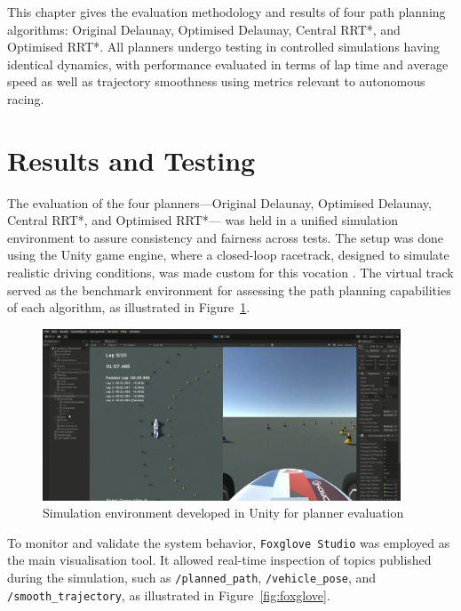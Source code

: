 \documentclass[a4paper,11pt]{report}
\begin{document}
This chapter gives the evaluation methodology and results of four path planning algorithms: Original Delaunay, 
Optimised Delaunay, Central RRT*, and Optimised RRT*. All planners undergo testing in controlled simulations having identical 
dynamics, with performance evaluated in terms of lap time and average speed as well as trajectory smoothness using metrics relevant to autonomous racing.

\section{Results and Testing}

The evaluation of the four planners—Original Delaunay, Optimised Delaunay, Central RRT*, and Optimised RRT*—
was held in a unified simulation environment to assure consistency and fairness across tests.
The setup was done using the Unity game engine, where a closed-loop racetrack, designed to simulate
realistic driving conditions, was made custom for this vocation \cite{reference17}.
The virtual track served as the benchmark environment for assessing the path planning capabilities of each algorithm,
as illustrated in Figure~\ref{fig:simulator}.

\begin{figure}[H]
    \centering
    \includegraphics[width=0.95\textwidth]{Images/simulator.png}
    \caption{Simulation environment developed in Unity for planner evaluation}
    \label{fig:simulator}
\end{figure}

To monitor and validate the system behavior, \texttt{Foxglove Studio} was employed as the 
main visualisation tool. It allowed real-time inspection of topics published during the simulation, 
such as \texttt{/planned\_path}, \texttt{/vehicle\_pose}, and \texttt{/smooth\_trajectory}, as illustrated in Figure~\ref{fig:foxglove}.
\end{document}
